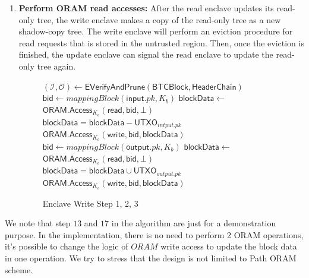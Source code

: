 \begin{enumerate}
	\item \textbf{Perform ORAM read accesses:} After the read enclave updates its read-only tree, the write enclave makes a copy of the read-only tree as a new shadow-copy tree. The write enclave will perform an eviction procedure for read requests that is stored in the untrusted region. Then,  once the eviction is finished, the update enclave can signal the read enclave to update the read-only tree again. 
	\begin{figure}[H]
	\centering
	\begin{minipage}{\linewidth}
	\begin{algorithm}[H]
	  	\caption{\newline$\mathsf{ObliviousUpdate}
	  	(\mathsf{BTCBlock, HeaderChain}, K_o, K_b, K_s)$
	  	}
	  	\begin{algorithmic}[1]
			\State $(\mathcal{I,O}) \leftarrow \mathsf{EVerifyAndPrune}(\mathsf{BTCBlock, HeaderChain})$
			\State $\mathsf{bid} \leftarrow mappingBlock(\mathsf{input}.pk,K_b)$
			\State $\mathsf{blockData} \leftarrow$ $\mathsf{{ORAM.Access}}_{K_o}(\mathsf{read, bid, \bot})$
			\State $\mathsf{blockData = blockData} - \mathsf{UTXO}_{intput.pk}$
			\EndIf		
			\State $\mathsf{{ORAM.Access}}_{K_o}(\mathsf{write, bid}, \mathsf{blockData})$		
			\EndFor
			\\
			\State $\mathsf{bid} \leftarrow mappingBlock(\mathsf{output}.pk,K_b)$
			\State $\mathsf{blockData} \leftarrow$ $\mathsf{{ORAM.Access}}_{K_o}(\mathsf{read, bid, \bot})$
			\State $\mathsf{blockData = blockData} \cup \mathsf{UTXO}_{output.pk}$
			\EndIf		
			\State $\mathsf{{ORAM.Access}}_{K_o}(\mathsf{write, bid}, \mathsf{blockData})$				
			\EndFor
		\end{algorithmic}	
	\end{algorithm}
	\end{minipage}
	\caption{Enclave Write Step 1, 2, 3}
	\label{fig:oupdate}
	\end{figure}
\end{enumerate}
\begin{remark}
	We note that step $13$ and $17$ in the algorithm are just for a demonstration purpose. In the implementation, there is no need to perform 2 ORAM operations, it's possible to change the logic of $ORAM$ write access to update the block data in one operation. We try to stress that the design is not limited to Path ORAM scheme. 
\end{remark}
